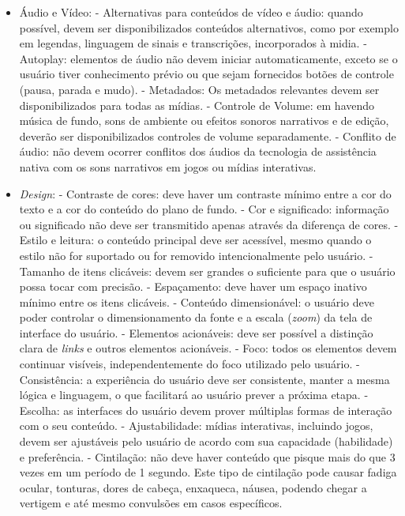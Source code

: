\begin{itemize}
	\item Áudio e Vídeo:
		\subitem - Alternativas para conteúdos de vídeo e áudio: quando possível, devem ser disponibilizados conteúdos alternativos, como por exemplo em legendas, linguagem de sinais e transcrições, incorporados à midia.
		\subitem - Autoplay: elementos de áudio não devem iniciar automaticamente, exceto se o usuário tiver conhecimento prévio ou que sejam fornecidos botões de controle (pausa, parada e mudo).
		\subitem - Metadados: Os metadados relevantes devem ser disponibilizados para todas as mídias.
		\subitem - Controle de Volume: em havendo música de fundo, sons de ambiente ou efeitos sonoros narrativos e de edição, deverão ser disponibilizados controles de volume separadamente.
		\subitem - Conflito de áudio: não devem ocorrer conflitos dos áudios da tecnologia de assistência nativa com os sons narrativos em jogos ou mídias interativas.
	\item \textit{Design}:
		\subitem - Contraste de cores: deve haver um contraste mínimo entre a cor do texto e a cor do conteúdo do plano de fundo.
		\subitem - Cor e significado: informação ou significado não deve ser transmitido apenas através da diferença de cores.
		\subitem - Estilo e leitura: o conteúdo principal deve ser acessível, mesmo quando o estilo não for suportado ou for removido intencionalmente pelo usuário.
		\subitem - Tamanho de itens clicáveis: devem ser grandes o suficiente para que o usuário possa tocar com precisão.
		\subitem - Espaçamento: deve haver um espaço inativo mínimo entre os itens clicáveis.
		\subitem - Conteúdo dimensionável: o usuário deve poder controlar o dimensionamento da fonte e a escala (\textit{zoom}) da tela de interface do usuário.
		\subitem - Elementos acionáveis: deve ser possível a distinção clara de \textit{links} e outros elementos acionáveis.
		\subitem - Foco: todos os elementos devem continuar visíveis, independentemente do foco utilizado pelo usuário.
		\subitem - Consistência: a experiência do usuário deve ser consistente, manter a mesma lógica e linguagem, o que facilitará ao usuário prever a próxima etapa.
		\subitem - Escolha: as interfaces do usuário devem prover múltiplas formas de interação com o seu conteúdo.
		\subitem - Ajustabilidade: mídias interativas, incluindo jogos, devem ser ajustáveis pelo usuário de acordo com sua capacidade (habilidade) e preferência.
		\subitem - Cintilação: não deve haver conteúdo que pisque mais do que 3 vezes em um período de 1 segundo. Este tipo de cintilação pode causar fadiga ocular, tonturas, dores de cabeça, enxaqueca, náusea, podendo chegar a vertigem e até mesmo convulsões em casos específicos.

\end{itemize}
